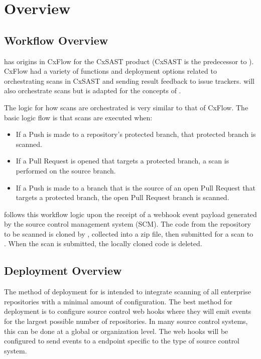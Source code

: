 \chapter{Overview}\label{sec:overview}

\section{Workflow Overview}

\cxoneflow has origins in CxFlow for the CxSAST product (CxSAST is the predecessor to \cxonens).  CxFlow
had a variety of functions and deployment options related to orchestrating scans in CxSAST and sending
result feedback to issue trackers.  \cxoneflow will also orchestrate scans but is adapted for the
concepts of \cxonens.

The \cxoneflow logic for how scans are orchestrated is very similar to that of CxFlow.  The basic
logic flow is that scans are executed when:

\begin{itemize}
    \item If a Push is made to a repository's protected branch, that protected branch is scanned.
    \item If a Pull Request is opened that targets a protected branch, a scan is performed on
    the source branch.
    \item If a Push is made to a branch that is the source of an open Pull Request that targets
    a protected branch, the open Pull Request branch is scanned.
\end{itemize}


\cxoneflow follows this workflow logic upon the receipt of a webhook event payload generated by the
source control management system (SCM). The code from the repository to be scanned is cloned by \cxoneflowns, 
collected into a zip file, then submitted for a scan to \cxonens.  When the scan is submitted,
the locally cloned code is deleted.


\section{Deployment Overview}

The method of deployment for \cxoneflow is intended to integrate scanning of all enterprise repositories
with a minimal amount of configuration.  The best method for deployment is to configure source control web
hooks where they will emit events for the largest possible number of repositories.  In many source control
systems, this can be done at a global or organization level.  The web hooks will be configured to send events
to a \cxoneflow endpoint specific to the type of source control system.

